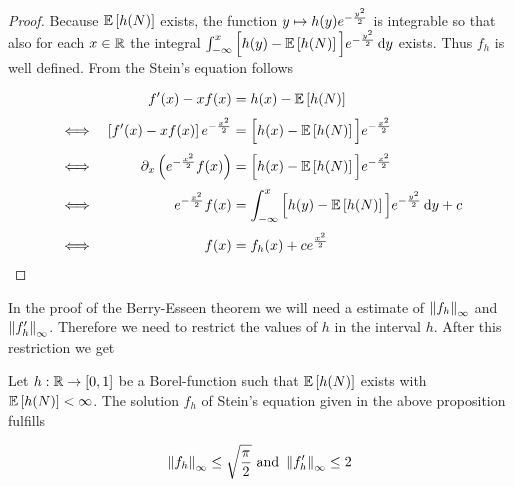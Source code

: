 \begin{proof}
   Because $\mathbb E\left[{h(N)}\right]$ exists, the function $y\mapsto h(y)e^{-\frac{y^2}{2}}$ is integrable so that also for each $x\in\mathbb R$ the integral ${\int_{-\infty}^x \Big[h(y)-\mathbb E\left[{h(N)}\right]\Big]e^{-\frac{y^2}{2}}\,\mathrm d{y}}$ exists. Thus $f_h$ is well defined. From the Stein's equation follows

  \begin{align}
    &      & f'(x)-xf(x) & = h(x) - \E{h(N)} \nl
    & \iff & \left[ f'(x) - xf(x) \right] \e{-\frac{x^2}{2}} &= \Big[h(x) - \E{h(N)}\Big] \e{-\frac{x^2}{2}} \nl
    & \iff & \partial_x \left( \e{-\frac{x^2}2} f(x) \right) &= \Big[h(x) - \E{h(N)}\Big] \e{-\frac{x^2}{2}} \nl
    & \iff & \e{-\frac{x^2}{2}} f(x) & = \int_{-\infty}^x \Big[ h(y) - \E{h(N)} \Big] \e{-\frac{y^2}{2}} \d{y} + c \nl
    & \iff & f(x) & = f_h(x) + c \e{\frac{x^2}{2}}
  \end{align}
\end{proof}

In the proof of the Berry-Esseen theorem we will need a estimate of $\left\|{f_h}\right\|_\infty$ and $\left\|{f_h'}\right\|_\infty$. Therefore we need to restrict the values of $h$ in the interval $h$. After this restriction we get

\begin{proposition}
  Let $h:\mathbb R \to [0,1]$ be a Borel-function such that $\mathbb E\left[{h(N)}\right]$ exists with $\mathbb E\left[{h(N)}\right]<\infty$. The solution $f_h$ of Stein's equation given in the above proposition fulfills

  \begin{align}
    \left\|{f_h}\right\|_\infty \le \sqrt{\frac \pi2} \text{ and } \left\|{f_h'}\right\|_\infty \le 2
  \end{align}
\end{proposition}


